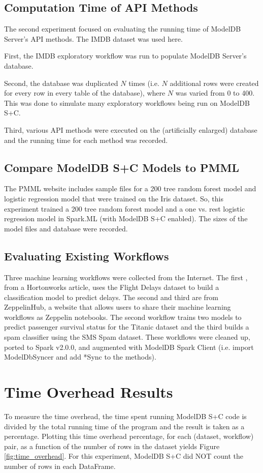 \subsection{Computation Time of API Methods}
The second experiment focused on evaluating the running time of ModelDB Server's API methods. The
IMDB dataset was used here.

First, the IMDB exploratory workflow was run to populate ModelDB Server's database.

Second, the database was duplicated $N$ times (i.e. $N$ additional rows were created for
every row in every table of the database), where $N$ was varied from 0 to 400. This was
done to simulate many exploratory workflows being run on ModelDB S+C.

Third, various API methods were executed on the (artificially enlarged) database and the
running time for each method was recorded.

\subsection{Compare ModelDB S+C Models to PMML}
The PMML website \cite{pmmlwebsite} includes sample files for a 200 tree random forest model
and logistic regression model that were trained on the Iris dataset. So, this
experiment trained a 200 tree random forest model and a one vs. rest logistic regression model
in Spark.ML (with ModelDB S+C enabled). The sizes of the model files and database
were recorded.

\subsection{Evaluating Existing Workflows}
Three machine learning workflows were collected from the Internet. The first \cite{flightworkflow}, from
a Hortonworks article, uses the Flight Delays dataset to build a classification model to predict
delays. The second \cite{titanicworkflow} and third \cite{spamworkflow} are from ZeppelinHub, a website that allows users to share their
machine learning workflows as Zeppelin notebooks. The second workflow trains two models
to predict passenger survival status for the Titanic dataset and the third builds a spam classifier
using the SMS Spam dataset. These workflows were cleaned up, ported to Spark v2.0.0, and 
augmented with ModelDB Spark Client (i.e. import ModelDbSyncer and add *Sync to the methods).

\section{Time Overhead Results}
To measure the time overhead, the time spent running ModelDB S+C code is divided 
by the total running time of the program and the result is taken as a percentage.
Plotting this time overhead percentage, for each (dataset, workflow) pair,
as a function of the number of rows in the dataset yields Figure \ref{fig:time_overhead}.
For this experiment, ModelDB S+C did NOT count the number of rows in each DataFrame.

